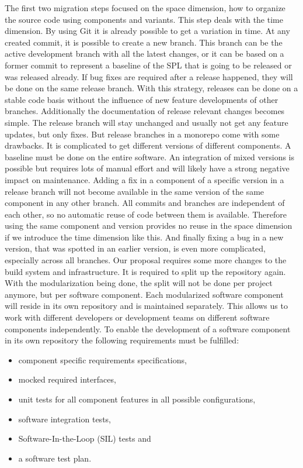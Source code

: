 The first two migration steps focused on the space dimension, how to organize
the source code using components and variants. This step deals with the time
dimension. By using Git it is already possible to get a variation in time. At
any created commit, it is possible to create a new branch. This branch can be
the active development branch with all the latest changes, or it can be based on
a former commit to represent a baseline of the SPL that is going to be released
or was released already. If bug fixes are required after a release happened,
they will be done on the same release branch. With this strategy, releases can
be done on a stable code basis without the influence of new feature developments
of other branches. Additionally the documentation of release relevant changes
becomes simple. The release branch will stay unchanged and usually not get any
feature updates, but only fixes. But release branches in a monorepo come with
some drawbacks. It is complicated to get different versions of different
components. A baseline must be done on the entire software. An integration of
mixed versions is possible but requires lots of manual effort and will likely
have a strong negative impact on maintenance. Adding a fix in a component of a
specific version in a release branch will not become available in the same
version of the same component in any other branch. All commits and branches are
independent of each other, so no automatic reuse of code between them is
available. Therefore using the same component and version provides no reuse in
the space dimension if we introduce the time dimension like this. And finally
fixing a bug in a new version, that was spotted in an earlier version, is even
more complicated, especially across all branches. Our proposal requires some
more changes to the build system and infrastructure. It is required to split up
the repository again. With the modularization being done, the split will not be
done per project anymore, but per software component. Each modularized software
component will reside in its own repository and is maintained separately. This
allows us to work with different developers or development teams on different
software components independently. To enable the development of a software
component in its own repository the following requirements must be fulfilled:
\begin{itemize}
  \item component specific requirements specifications,
  \item mocked required interfaces,
  \item unit tests for all component features in all possible configurations,
  \item software integration tests,
  \item Software-In-the-Loop (SIL) tests and
  \item a software test plan.
\end{itemize}
